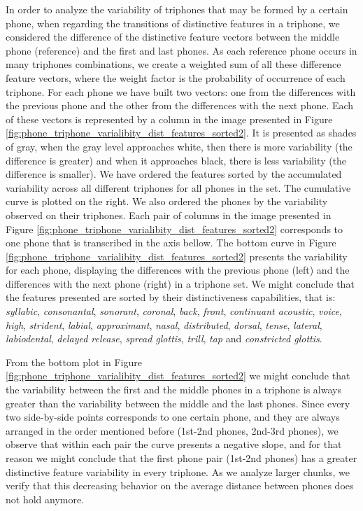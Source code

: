In order to analyze the variability of triphones that may be formed by a certain phone, 
when regarding the transitions of distinctive features in a triphone, we 
considered the difference of the distinctive feature vectors between the middle phone
(reference) and the first and last phones. As each reference phone occurs in many
triphones combinations, we create a weighted sum of all these difference feature vectors, 
where the weight factor is the probability of occurrence of each triphone. For each
phone we have built two vectors: one from the differences with the previous phone
and the other from the differences with the next phone.
Each of these vectors is represented by a column in the image presented
in Figure \ref{fig:phone_triphone_varialibity_dist_features_sorted2}.
It is presented as shades of gray, when the gray level approaches white,
then there is more variability (the difference is greater) and when it approaches
black, there is less variability (the difference is smaller).
We have ordered the features sorted by the accumulated variability across 
all different triphones for all phones in the set. The cumulative curve is plotted on the right. 
We also ordered the phones
by the variability observed on their triphones. Each pair of columns 
in the image presented in Figure \ref{fig:phone_triphone_varialibity_dist_features_sorted2}
corresponds to one phone that is transcribed in the axis bellow.
The bottom curve in Figure \ref{fig:phone_triphone_varialibity_dist_features_sorted2}
presents the variability for each phone, 
displaying
the differences with the previous phone (left) and the differences with
the next phone (right) in a triphone set.
We might conclude that the features presented are sorted by their distinctiveness 
capabilities, that is: \textit{syllabic}, \textit{consonantal}, \textit{sonorant}, \textit{coronal}, 
\textit{back}, \textit{front}, \textit{continuant acoustic}, \textit{voice}, \textit{high}, 
\textit{strident}, \textit{labial}, \textit{approximant}, \textit{nasal}, \textit{distributed},
\textit{dorsal}, \textit{tense}, \textit{lateral}, \textit{labiodental}, \textit{delayed release}, 
\textit{spread glottis}, \textit{trill}, \textit{tap} and \textit{constricted glottis}.


From the bottom plot in Figure \ref{fig:phone_triphone_varialibity_dist_features_sorted2}
we might conclude that the variability between the first and the middle phones in a triphone
is always greater than the variability between the middle and the last phones.
Since every two side-by-side points corresponds to one certain phone, and they are always arranged 
in the order mentioned before (1st-2nd phones, 2nd-3rd phones), 
we observe that within each pair the curve presents a negative slope,
and for that reason we might conclude that the first phone pair (1st-2nd phones) has a greater distinctive
feature variability in every triphone.
As we analyze larger chunks, we verify that this decreasing behavior on the average distance
between phones does not hold anymore.

